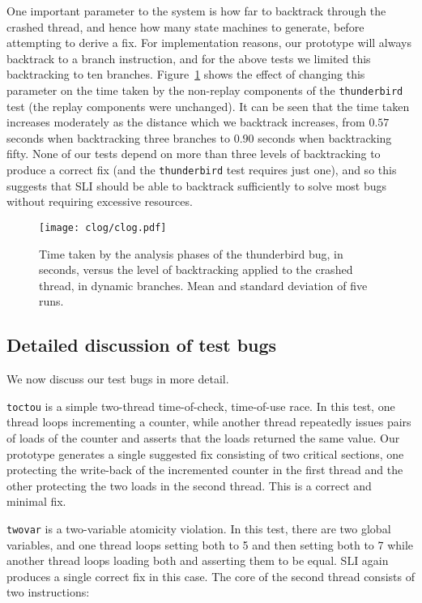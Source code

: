 \documentclass[10pt,letter,twocolumn]{sigplanconf}
\newcommand{\editorial}[1]{}
\begin{document}
One important parameter to the system is how far to backtrack through
the crashed thread, and hence how many state machines to generate,
before attempting to derive a fix.  For implementation reasons, our
prototype will always backtrack to a branch instruction, and for the
above tests we limited this backtracking to ten branches.
Figure~\ref{fig:eval:backtrack} shows the effect of changing this
parameter on the time taken by the non-replay components of the
\verb|thunderbird| test (the replay components were unchanged).  It
can be seen that the time taken increases moderately as the distance
which we backtrack increases, from $0.57$ seconds when backtracking
three branches to $0.90$ seconds when backtracking fifty.  None of our
tests depend on more than three levels of backtracking to produce a
correct fix (and the \verb|thunderbird| test requires just one), and
so this suggests that SLI should be able to backtrack sufficiently to
solve most bugs without requiring excessive resources.\editorial{Meh.}

\begin{figure}
\texttt{[image: clog/clog.pdf]}
\caption{Time taken by the analysis phases of the thunderbird bug, in
  seconds, versus the level of backtracking applied to the crashed
  thread, in dynamic branches.  Mean and standard deviation of five
  runs.}
\label{fig:eval:backtrack}
\end{figure}


\subsection{Detailed discussion of test bugs}
\label{sect:bug_descr}

We now discuss our test bugs in more detail.

\verb|toctou| is a simple two-thread time-of-check, time-of-use race.
In this test, one thread loops incrementing a counter, while another
thread repeatedly issues pairs of loads of the counter and asserts
that the loads returned the same value.  Our prototype generates a
single suggested fix consisting of two critical sections, one
protecting the write-back of the incremented counter in the first
thread and the other protecting the two loads in the second thread.
This is a correct and minimal fix.

\verb|twovar| is a two-variable atomicity violation.  In this test,
there are two global variables, and one thread loops setting both to 5
and then setting both to 7 while another thread loops loading both and
asserting them to be equal.  SLI again produces a single correct fix
in this case.  The core of the second thread consists of two
instructions:
\end{document}
